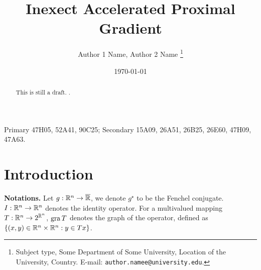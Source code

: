\documentclass[12pt]{article}
\title{{\fontfamily{ptm}\selectfont Inexect Accelerated Proximal Gradient }}
\author{
    Author 1 Name, Author 2 Name
    \thanks{
        Subject type, Some Department of Some University, Location of the University,
        Country. E-mail: \texttt{author.namee@university.edu}.
    }
}
\begin{document}
\date{\today}
\maketitle
{}
\begin{abstract} 
    \noindent
    This is still a draft. \cite{zhang_robust_2022}. 
\end{abstract}
Primary 47H05, 52A41, 90C25; Secondary 15A09, 26A51, 26B25, 26E60, 47H09, 47A63.

\section{Introduction}
    \textbf{Notations.}
    Let $g: \mathbb R^n \rightarrow\overline {\mathbb R}$, we denote $g^\star$ to be the Fenchel conjugate. 
    $I: \mathbb R^n \rightarrow \mathbb R^n$ denotes the identity operator.
    For a multivalued mapping $T: \mathbb R^n \rightarrow 2^{\mathbb R^n}$, $\operatorname{gra} T$ denotes the graph of the operator, defined as $\{(x, y)\in \mathbb R^n \times \mathbb R^n : y \in Tx\}$. 
\end{document}
